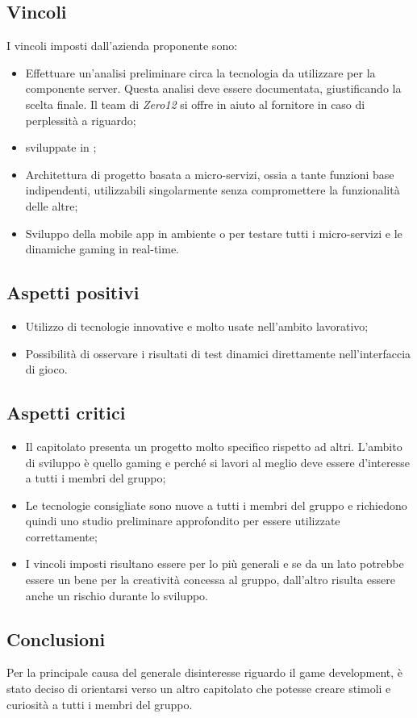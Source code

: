 \subsection{Vincoli}
I vincoli imposti dall'azienda proponente sono:
\begin{itemize}
\item Effettuare un'analisi preliminare circa la tecnologia da utilizzare per la componente server. Questa analisi deve essere documentata, giustificando la scelta finale. Il team di \textit{Zero12} si offre in aiuto al fornitore in caso di perplessità a riguardo;
\item {} sviluppate in ;
\item Architettura di progetto basata a micro-servizi, ossia a tante funzioni base indipendenti, utilizzabili singolarmente senza compromettere la funzionalità delle altre;
\item Sviluppo della mobile app in ambiente  o  per testare tutti i micro-servizi e le dinamiche gaming in real-time. 
\end{itemize}

\subsection{Aspetti positivi}
\begin{itemize}
\item Utilizzo di tecnologie innovative e molto usate nell'ambito lavorativo;
\item Possibilità di osservare i risultati di test dinamici direttamente nell'interfaccia di gioco.
\end{itemize}

\subsection{Aspetti critici}
\begin{itemize}
\item Il capitolato presenta un progetto molto specifico rispetto ad altri. L'ambito di sviluppo è quello gaming e perché si lavori al meglio deve essere d'interesse a tutti i membri del gruppo;
\item Le tecnologie consigliate sono nuove a tutti i membri del gruppo e richiedono quindi uno studio preliminare approfondito per essere utilizzate correttamente;
\item I vincoli imposti risultano essere per lo più generali e se da un lato potrebbe essere un bene per la creatività concessa al gruppo, dall'altro risulta essere anche un rischio durante lo sviluppo. 
\end{itemize}

\subsection{Conclusioni}
Per la principale causa del generale disinteresse riguardo il game development, è stato deciso di orientarsi verso un altro capitolato che potesse creare stimoli e curiosità a tutti i membri del gruppo.
